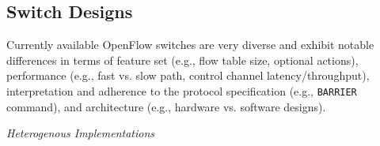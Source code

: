 \subsection{Switch Designs}

Currently available OpenFlow switches are very diverse and exhibit notable differences in terms of 
feature set (e.g., flow table size,  optional actions), performance (e.g., fast vs. slow 
path, control channel latency/throughput), interpretation and adherence to the protocol 
specification (e.g., \texttt{BARRIER} command), and architecture (e.g., hardware vs. software designs).

\vspace{2mm}
\noindent \textit{Heterogenous Implementations}

